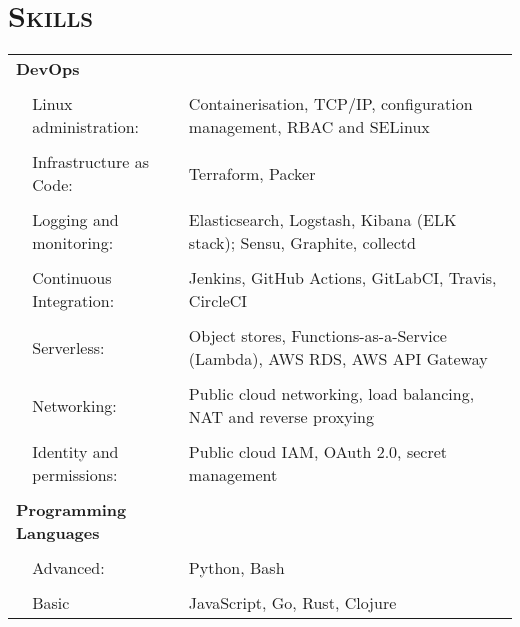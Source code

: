 \documentclass[a4paper,10pt]{article} %
\begin{document}

\section{\textsc{Skills}}
\begin{tabularx}{\textwidth}{p{0.3cm}|p{4cm}X}
\multicolumn{2}{l}{\textbf{DevOps}} & \\
\multicolumn{3}{c}{} \\ %
   & Linux administration:               & Containerisation, TCP/IP, configuration management, RBAC and SELinux \\
     \\
   & Infrastructure as Code:             & Terraform, Packer \\
     \\
   & Logging and monitoring:             & Elasticsearch, Logstash, Kibana (ELK stack); Sensu, Graphite, collectd \\
     \\
   & Continuous Integration:             & Jenkins, GitHub Actions, GitLabCI, Travis, CircleCI \\
     \\
   & Serverless:                         & Object stores, Functions-as-a-Service (Lambda), AWS RDS, AWS API Gateway \\
     \\
   & Networking:                         & Public cloud networking, load balancing, NAT and reverse proxying \\
     \\
   & Identity and permissions:           & Public cloud IAM, OAuth 2.0, secret management \\
\multicolumn{3}{c}{} \\ %
\multicolumn{2}{l}{\textbf{Programming Languages}}      & \\
\multicolumn{3}{c}{} \\ %
  &  Advanced:                           & Python, Bash \\
     \\
  &  Basic                               & JavaScript, Go, Rust, Clojure \\
\end{tabularx}
\end{document}
